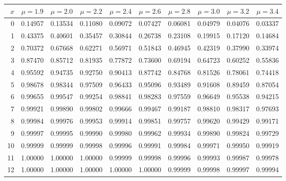 \myskip
\begin{tabular}{r|*{9}{c}}
$x$ &  $\mu=1.9$  &  $\mu=2.0$  &  $\mu=2.2$  &  $\mu=2.4$  &  $\mu=2.6$
    &  $\mu=2.8$  &  $\mu=3.0$  &  $\mu=3.2$  &  $\mu=3.4$                    \\\hline
  0 & 0.14957 & 0.13534 & 0.11080 & 0.09072 & 0.07427 & 0.06081 & 0.04979 & 0.04076 & 0.03337 \\
  1 & 0.43375 & 0.40601 & 0.35457 & 0.30844 & 0.26738 & 0.23108 & 0.19915 & 0.17120 & 0.14684 \\
  2 & 0.70372 & 0.67668 & 0.62271 & 0.56971 & 0.51843 & 0.46945 & 0.42319 & 0.37990 & 0.33974 \\
  3 & 0.87470 & 0.85712 & 0.81935 & 0.77872 & 0.73600 & 0.69194 & 0.64723 & 0.60252 & 0.55836 \\
  4 & 0.95592 & 0.94735 & 0.92750 & 0.90413 & 0.87742 & 0.84768 & 0.81526 & 0.78061 & 0.74418 \\
  5 & 0.98678 & 0.98344 & 0.97509 & 0.96433 & 0.95096 & 0.93489 & 0.91608 & 0.89459 & 0.87054 \\
  6 & 0.99655 & 0.99547 & 0.99254 & 0.98841 & 0.98283 & 0.97559 & 0.96649 & 0.95538 & 0.94215 \\
  7 & 0.99921 & 0.99890 & 0.99802 & 0.99666 & 0.99467 & 0.99187 & 0.98810 & 0.98317 & 0.97693 \\
  8 & 0.99984 & 0.99976 & 0.99953 & 0.99914 & 0.99851 & 0.99757 & 0.99620 & 0.99429 & 0.99171 \\
  9 & 0.99997 & 0.99995 & 0.99990 & 0.99980 & 0.99962 & 0.99934 & 0.99890 & 0.99824 & 0.99729 \\
 10 & 0.99999 & 0.99999 & 0.99998 & 0.99996 & 0.99991 & 0.99984 & 0.99971 & 0.99950 & 0.99919 \\
 11 & 1.00000 & 1.00000 & 1.00000 & 0.99999 & 0.99998 & 0.99996 & 0.99993 & 0.99987 & 0.99978 \\
 12 & 1.00000 & 1.00000 & 1.00000 & 1.00000 & 1.00000 & 0.99999 & 0.99998 & 0.99997 & 0.99994 \\
\end{tabular}

